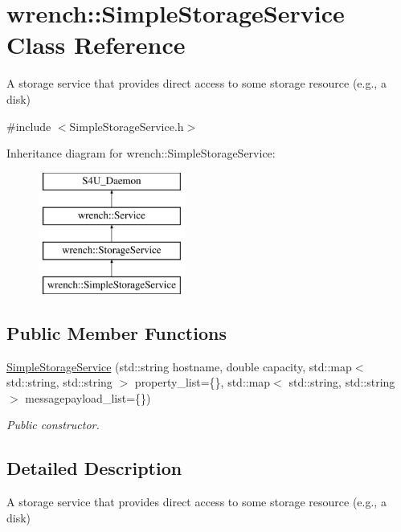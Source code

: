 \hypertarget{classwrench_1_1_simple_storage_service}{}\section{wrench\+:\+:Simple\+Storage\+Service Class Reference}
\label{classwrench_1_1_simple_storage_service}


A storage service that provides direct access to some storage resource (e.\+g., a disk)  




{\ttfamily \#include $<$Simple\+Storage\+Service.\+h$>$}

Inheritance diagram for wrench\+:\+:Simple\+Storage\+Service\+:\begin{figure}[H]
\begin{center}
\leavevmode
\includegraphics[height=4.000000cm]{classwrench_1_1_simple_storage_service}
\end{center}
\end{figure}
\subsection*{Public Member Functions}
\begin{DoxyCompactItemize}
\item 
\hyperlink{classwrench_1_1_simple_storage_service_a736cb5fb3b3d3a61c344cae0770616c4}{Simple\+Storage\+Service} (std\+::string hostname, double capacity, std\+::map$<$ std\+::string, std\+::string $>$ property\+\_\+list=\{\}, std\+::map$<$ std\+::string, std\+::string $>$ messagepayload\+\_\+list=\{\})
\begin{DoxyCompactList}\small\item\em Public constructor. \end{DoxyCompactList}\end{DoxyCompactItemize}


\subsection{Detailed Description}
A storage service that provides direct access to some storage resource (e.\+g., a disk) 

